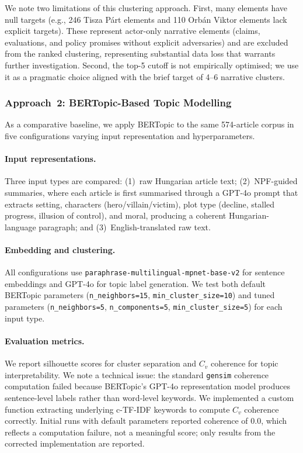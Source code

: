 \documentclass[10pt, a4paper]{article}
\begin{document}
We note two limitations of this clustering approach. First, many elements have null targets (e.g., 246 Tisza P\'art elements and 110 Orb\'an Viktor elements lack explicit targets). These represent actor-only narrative elements (claims, evaluations, and policy promises without explicit adversaries) and are excluded from the ranked clustering, representing substantial data loss that warrants further investigation. Second, the top-5 cutoff is not empirically optimised; we use it as a pragmatic choice aligned with the brief target of 4--6 narrative clusters.

\subsubsection{Approach~2: BERTopic-Based Topic Modelling}
\label{sec:bertopic}

As a comparative baseline, we apply BERTopic \citep{grootendorst2022bertopic} to the same 574-article corpus in five configurations varying input representation and hyperparameters.

\paragraph{Input representations.}
Three input types are compared: (1)~raw Hungarian article text; (2)~NPF-guided summaries, where each article is first summarised through a GPT-4o prompt that extracts setting, characters (hero/villain/victim), plot type (decline, stalled progress, illusion of control), and moral, producing a coherent Hungarian-language paragraph; and (3)~English-translated raw text.

\paragraph{Embedding and clustering.}
All configurations use \texttt{paraphrase-multilingual-mpnet-base-v2} for sentence embeddings and GPT-4o for topic label generation. We test both default BERTopic parameters (\texttt{n\_neighbors=15}, \texttt{min\_cluster\_size=10}) and tuned parameters (\texttt{n\_neighbors=5}, \texttt{n\_components=5}, \texttt{min\_cluster\_size=5}) for each input type.

\paragraph{Evaluation metrics.}
We report silhouette scores for cluster separation and $C_v$ coherence for topic interpretability. We note a technical issue: the standard \texttt{gensim} coherence computation failed because BERTopic's GPT-4o representation model produces sentence-level labels rather than word-level keywords. We implemented a custom function extracting underlying c-TF-IDF keywords to compute $C_v$ coherence correctly. Initial runs with default parameters reported coherence of 0.0, which reflects a computation failure, not a meaningful score; only results from the corrected implementation are reported.
\end{document}
